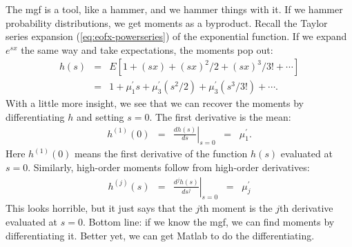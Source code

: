 \documentclass[11pt]{article}
\begin{document}
The mgf is a tool, like a hammer, and we hammer things with it.
If we hammer probability distributions, we get moments as a byproduct.
Recall the Taylor series expansion (\ref{eq:eofx-powerseries}) of the exponential function.
If we expand $e^{sx}$ the same way and take expectations,
the moments pop out:
\begin{eqnarray*}
    h(s) &=& E \left[ 1 + (sx) + (sx)^2/2 + (sx)^3/3! + \cdots \right] \\
            &=&  1 + \mu_1^\prime s + \mu_3^\prime (s^2/2)  + \mu_3^\prime (s^3/3!)  + \cdots .
\end{eqnarray*}
With a little more insight, we see that we can recover the moments by differentiating
$h$ and setting $s=0$.
The first derivative is the mean:
\begin{eqnarray*}
    h^{(1)} (0)  &=& \left. \frac{ d h(s)}{d s} \right|_{s=0}
            \;\;=\;\;  \mu_1^\prime .
\end{eqnarray*}
Here $h^{(1)}(0)$ means the first derivative of the function $h(s)$ evaluated at
$s=0$.
Similarly, high-order moments follow from high-order derivatives:
\begin{eqnarray*}
    h^{(j)} (s)  &=& \left. \frac{d^j h(s)}{d s^j} \right|_{s=0}
            \;\;=\;\;  \mu_j^\prime
\end{eqnarray*}
This looks horrible, but it just says that the $j$th moment is the $j$th derivative
evaluated at $s=0$.
Bottom line:  if we know the mgf, we can find moments by differentiating it.
Better yet, we can get Matlab to do the differentiating.
\end{document}

